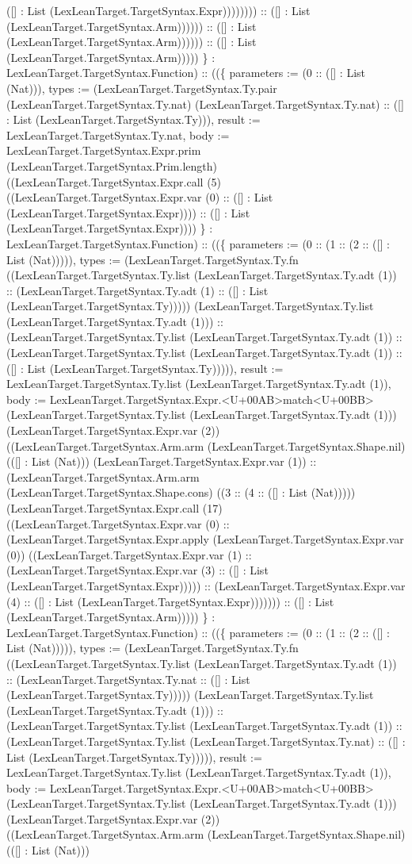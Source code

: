 \documentclass[11pt]{article}
\begin{document}
([] : List (LexLeanTarget.TargetSyntax.Expr)))))))) :: ([] : List (LexLeanTarget.TargetSyntax.Arm)))))) :: ([] : List (LexLeanTarget.TargetSyntax.Arm)))))) :: ([] : List (LexLeanTarget.TargetSyntax.Arm))))) \} : LexLeanTarget.TargetSyntax.Function) :: ((\{ parameters := (0 :: ([] : List (Nat))), types := (LexLeanTarget.TargetSyntax.Ty.pair (LexLeanTarget.TargetSyntax.Ty.nat) (LexLeanTarget.TargetSyntax.Ty.nat) :: ([] : List (LexLeanTarget.TargetSyntax.Ty))), result := LexLeanTarget.TargetSyntax.Ty.nat, body := LexLeanTarget.TargetSyntax.Expr.prim (LexLeanTarget.TargetSyntax.Prim.length) ((LexLeanTarget.TargetSyntax.Expr.call (5) ((LexLeanTarget.TargetSyntax.Expr.var (0) :: ([] : List (LexLeanTarget.TargetSyntax.Expr)))) :: ([] : List (LexLeanTarget.TargetSyntax.Expr)))) \} : LexLeanTarget.TargetSyntax.Function) :: ((\{ parameters := (0 :: (1 :: (2 :: ([] : List (Nat))))), types := (LexLeanTarget.TargetSyntax.Ty.fn ((LexLeanTarget.TargetSyntax.Ty.list (LexLeanTarget.TargetSyntax.Ty.adt (1)) :: (LexLeanTarget.TargetSyntax.Ty.adt (1) :: ([] : List (LexLeanTarget.TargetSyntax.Ty))))) (LexLeanTarget.TargetSyntax.Ty.list (LexLeanTarget.TargetSyntax.Ty.adt (1))) :: (LexLeanTarget.TargetSyntax.Ty.list (LexLeanTarget.TargetSyntax.Ty.adt (1)) :: (LexLeanTarget.TargetSyntax.Ty.list (LexLeanTarget.TargetSyntax.Ty.adt (1)) :: ([] : List (LexLeanTarget.TargetSyntax.Ty))))), result := LexLeanTarget.TargetSyntax.Ty.list (LexLeanTarget.TargetSyntax.Ty.adt (1)), body := LexLeanTarget.TargetSyntax.Expr.<U+00AB>match<U+00BB> (LexLeanTarget.TargetSyntax.Ty.list (LexLeanTarget.TargetSyntax.Ty.adt (1))) (LexLeanTarget.TargetSyntax.Expr.var (2)) ((LexLeanTarget.TargetSyntax.Arm.arm (LexLeanTarget.TargetSyntax.Shape.nil) (([] : List (Nat))) (LexLeanTarget.TargetSyntax.Expr.var (1)) :: (LexLeanTarget.TargetSyntax.Arm.arm (LexLeanTarget.TargetSyntax.Shape.cons) ((3 :: (4 :: ([] : List (Nat))))) (LexLeanTarget.TargetSyntax.Expr.call (17) ((LexLeanTarget.TargetSyntax.Expr.var (0) :: (LexLeanTarget.TargetSyntax.Expr.apply (LexLeanTarget.TargetSyntax.Expr.var (0)) ((LexLeanTarget.TargetSyntax.Expr.var (1) :: (LexLeanTarget.TargetSyntax.Expr.var (3) :: ([] : List (LexLeanTarget.TargetSyntax.Expr))))) :: (LexLeanTarget.TargetSyntax.Expr.var (4) :: ([] : List (LexLeanTarget.TargetSyntax.Expr))))))) :: ([] : List (LexLeanTarget.TargetSyntax.Arm))))) \} : LexLeanTarget.TargetSyntax.Function) :: ((\{ parameters := (0 :: (1 :: (2 :: ([] : List (Nat))))), types := (LexLeanTarget.TargetSyntax.Ty.fn ((LexLeanTarget.TargetSyntax.Ty.list (LexLeanTarget.TargetSyntax.Ty.adt (1)) :: (LexLeanTarget.TargetSyntax.Ty.nat :: ([] : List (LexLeanTarget.TargetSyntax.Ty))))) (LexLeanTarget.TargetSyntax.Ty.list (LexLeanTarget.TargetSyntax.Ty.adt (1))) :: (LexLeanTarget.TargetSyntax.Ty.list (LexLeanTarget.TargetSyntax.Ty.adt (1)) :: (LexLeanTarget.TargetSyntax.Ty.list (LexLeanTarget.TargetSyntax.Ty.nat) :: ([] : List (LexLeanTarget.TargetSyntax.Ty))))), result := LexLeanTarget.TargetSyntax.Ty.list (LexLeanTarget.TargetSyntax.Ty.adt (1)), body := LexLeanTarget.TargetSyntax.Expr.<U+00AB>match<U+00BB> (LexLeanTarget.TargetSyntax.Ty.list (LexLeanTarget.TargetSyntax.Ty.adt (1))) (LexLeanTarget.TargetSyntax.Expr.var (2)) ((LexLeanTarget.TargetSyntax.Arm.arm (LexLeanTarget.TargetSyntax.Shape.nil) (([] : List (Nat))) 
\end{document}
